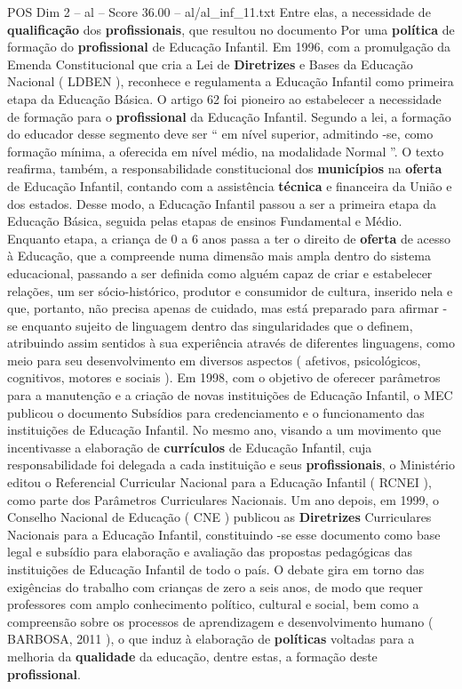 \begin{textsample}{POS Dim 2 – al – Score 36.00 – al/al\_inf\_11.txt}
Entre elas, a necessidade de \textbf{qualificação} dos \textbf{profissionais}, que resultou no documento Por uma \textbf{política} de formação do \textbf{profissional} de Educação Infantil.
Em 1996, com a promulgação da Emenda Constitucional que cria a Lei de \textbf{Diretrizes} e Bases da Educação Nacional ( LDBEN ), reconhece e regulamenta a Educação Infantil como primeira etapa da Educação Básica.
O artigo 62 foi pioneiro ao estabelecer a necessidade de formação para o \textbf{profissional} da Educação Infantil.
Segundo a lei, a formação do educador desse segmento deve ser “ em nível superior, admitindo -se, como formação mínima, a oferecida em nível médio, na modalidade Normal ”.
O texto reafirma, também, a responsabilidade constitucional dos \textbf{municípios} na \textbf{oferta} de Educação Infantil, contando com a assistência \textbf{técnica} e financeira da União e dos estados.
Desse modo, a Educação Infantil passou a ser a primeira etapa da Educação Básica, seguida pelas etapas de ensinos Fundamental e Médio.
Enquanto etapa, a criança de 0 a 6 anos passa a ter o direito de \textbf{oferta} de acesso à Educação, que a compreende numa dimensão mais ampla dentro do sistema educacional, passando a ser definida como alguém capaz de criar e estabelecer relações, um ser sócio-histórico, produtor e consumidor de cultura, inserido nela e que, portanto, não precisa apenas de cuidado, mas está preparado para afirmar -se enquanto sujeito de linguagem dentro das singularidades que o definem, atribuindo assim sentidos à sua experiência através de diferentes linguagens, como meio para seu desenvolvimento em diversos aspectos ( afetivos, psicológicos, cognitivos, motores e sociais ).
Em 1998, com o objetivo de oferecer parâmetros para a manutenção e a criação de novas instituições de Educação Infantil, o MEC publicou o documento Subsídios para credenciamento e o funcionamento das instituições de Educação Infantil.
No mesmo ano, visando a um movimento que incentivasse a elaboração de \textbf{currículos} de Educação Infantil, cuja responsabilidade foi delegada a cada instituição e seus \textbf{profissionais}, o Ministério editou o Referencial Curricular Nacional para a Educação Infantil ( RCNEI ), como parte dos Parâmetros Curriculares Nacionais.
Um ano depois, em 1999, o Conselho Nacional de Educação ( CNE ) publicou as \textbf{Diretrizes} Curriculares Nacionais para a Educação Infantil, constituindo -se esse documento como base legal e subsídio para elaboração e avaliação das propostas pedagógicas das instituições de Educação Infantil de todo o país.
O debate gira em torno das exigências do trabalho com crianças de zero a seis anos, de modo que requer professores com amplo conhecimento político, cultural e social, bem como a compreensão sobre os processos de aprendizagem e desenvolvimento humano ( BARBOSA, 2011 ), o que induz à elaboração de \textbf{políticas} voltadas para a melhoria da \textbf{qualidade} da educação, dentre estas, a formação deste \textbf{profissional}.

\end{textsample}
